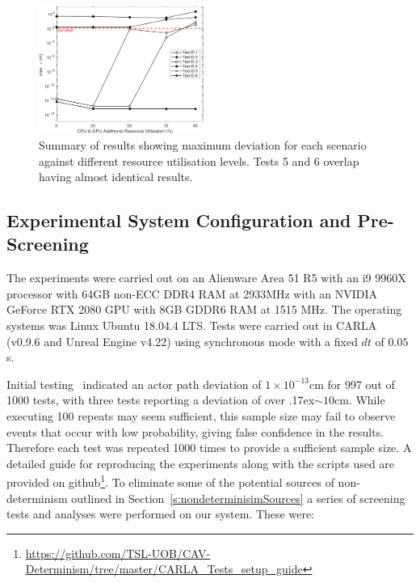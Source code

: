 \documentclass[letterpaper, 10 pt, journal, twoside]{IEEEtran}
\begin{document}
\begin{figure}[t]
    \centering
    \includegraphics[width=0.48\textwidth]{Other/Figures/ExperimentsStressSummaryV6.pdf}
    \caption{Summary of results showing maximum deviation for each scenario against different resource utilisation levels. Tests 5 and 6 overlap having almost identical results.}
    \label{ExperimentsStressSummary}
\end{figure}
	
\subsection{Experimental System Configuration and Pre-Screening}\label{s:screening}
The experiments were carried out on an Alienware Area 51 R5 with an i9 9960X processor with 64GB non-ECC DDR4 RAM at 2933MHz with an NVIDIA GeForce RTX 2080 GPU with 8GB GDDR6 RAM at 1515 MHz. 
%
The operating systems was Linux Ubuntu 18.04.4 LTS. 
%
Tests were carried out in CARLA (v0.9.6 and Unreal Engine v4.22) using synchronous mode with a fixed $dt$ of $0.05$s. 

Initial testing~\cite{TSLUnrealEngineTesting} indicated an actor path deviation of $1\times10^{-13}$cm for 997 out of 1000 tests, with three tests reporting a deviation of over {\raise.17ex\hbox{$\scriptstyle\sim$}}$10$cm. While executing 100 repeats may seem sufficient, this sample size may fail to observe events that occur with low probability, giving false confidence in the results. 
Therefore each test was repeated 1000 times to provide a sufficient sample size.
%
A detailed guide for reproducing the experiments along with the scripts used are provided on github\footnote{\url{https://github.com/TSL-UOB/CAV-Determinism/tree/master/CARLA_Tests_setup_guide}}.
%
To eliminate some of the potential sources of non-determinism outlined in Section~\ref{s:nondeterminisimSources} a series of screening tests and analyses were performed on our system. These were:
\end{document}
